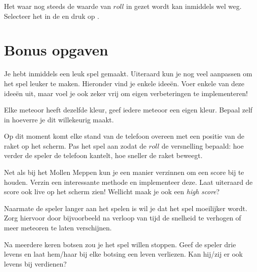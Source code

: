 
\runOpTelefoon{}
\begin{opgave}
	\opgVraag
	Het  waar nog steeds de waarde van $roll$ in gezet wordt kan inmiddels wel weg. Selecteer het in de  en druk op . 
\end{opgave}

\section{Bonus opgaven}
Je hebt inmiddels een leuk spel gemaakt. Uiteraard kun je nog veel aanpassen om het spel leuker te maken. Hieronder vind je enkele idee\"en. Voer enkele van deze idee\"en uit, maar voel je ook zeker vrij om eigen verbeteringen te implementeren!

\begin{opgave}
	\opgVraag
	Elke meteoor heeft dezelfde kleur, geef iedere meteoor een eigen kleur. Bepaal zelf in hoeverre je dit willekeurig maakt.
\end{opgave}

\begin{opgave}
	\opgVraag
	Op dit moment komt elke stand van de telefoon overeen met een positie van de raket op het scherm. Pas het spel aan zodat de $roll$ de versnelling bepaald: hoe verder de speler de telefoon kantelt, hoe sneller de raket beweegt.
\end{opgave}

\begin{opgave}
	\opgVraag
	Net als bij het Mollen Meppen kun je een manier verzinnen om een score bij te houden. Verzin een interessante methode en implementeer deze. Laat uiteraard de score ook live op het scherm zien! Wellicht maak je ook een \emph{high score}?
\end{opgave}

\begin{opgave}
	\opgVraag
	Naarmate de speler langer aan het spelen is wil je dat het spel moeilijker wordt. Zorg hiervoor door bijvoorbeeld na verloop van tijd de snelheid te verhogen of meer meteoren te laten verschijnen.
\end{opgave}

\begin{opgave}
	\opgVraag
	Na meerdere keren botsen zou je het spel willen stoppen. Geef de speler drie levens en laat hem/haar bij elke botsing een leven verliezen. Kan hij/zij er ook levens bij verdienen?
\end{opgave}
